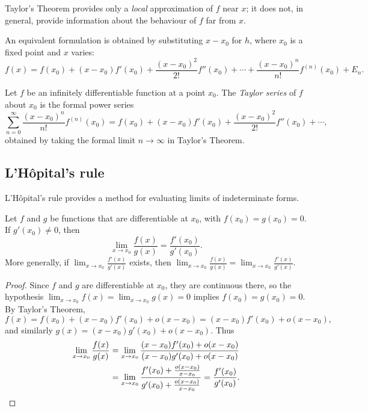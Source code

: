\documentclass[a4paper]{article}
\begin{document}
\begin{remark}
  Taylor's Theorem provides only a \emph{local} approximation of $f$ near $x$; it does not, in general, provide information about the behaviour of $f$ far from $x$.

  An equivalent formulation is obtained by substituting $x - x_0$ for $h$, where $x_0$ is a fixed point and $x$ varies:
  \[
    f(x) = f(x_0) + (x-x_0)f'(x_0) + \frac{(x-x_0)^2}{2!}f''(x_0) + \cdots + \frac{(x-x_0)^n}{n!}f^{(n)}(x_0) + E_n.
  \]
\end{remark}

\begin{defi}
  Let $f$ be an infinitely differentiable function at a point $x_0$. The \emph{Taylor series} of $f$ about $x_0$ is the formal power series
  \[
    \sum_{n=0}^{\infty} \frac{(x-x_0)^n}{n!}f^{(n)}(x_0) = f(x_0) + (x-x_0)f'(x_0) + \frac{(x-x_0)^2}{2!}f''(x_0) + \cdots,
  \]
  obtained by taking the formal limit $n \to \infty$ in Taylor's Theorem.
\end{defi}

\subsection{L'H\^opital's rule}
L'H\^opital's rule provides a method for evaluating limits of indeterminate forms.

\begin{thm}
  Let $f$ and $g$ be functions that are differentiable at $x_0$, with $f(x_0) = g(x_0) = 0$. If $g'(x_0) \neq 0$, then
  \[
    \lim_{x\to x_0} \frac{f(x)}{g(x)} = \frac{f'(x_0)}{g'(x_0)}.
  \]
  More generally, if $\displaystyle\lim_{x\to x_0} \frac{f'(x)}{g'(x)}$ exists, then $\displaystyle\lim_{x\to x_0} \frac{f(x)}{g(x)} = \lim_{x\to x_0} \frac{f'(x)}{g'(x)}$.
\end{thm}

\begin{proof}
  Since $f$ and $g$ are differentiable at $x_0$, they are continuous there, so the hypothesis $\lim_{x\to x_0}f(x) = \lim_{x\to x_0}g(x) = 0$ implies $f(x_0) = g(x_0) = 0$. By Taylor's Theorem,
  \[
    f(x) = f(x_0) + (x - x_0)f'(x_0) + o(x - x_0) = (x - x_0)f'(x_0) + o(x - x_0),
  \]
  and similarly $g(x) = (x - x_0)g'(x_0) + o(x - x_0)$. Thus
  \begin{align*}
    \lim_{x\to x_0} \frac{f(x)}{g(x)} &= \lim_{x\to x_0} \frac{(x - x_0)f'(x_0) + o(x - x_0)}{(x - x_0)g'(x_0) + o(x - x_0)}\\
    &= \lim_{x\to x_0} \frac{f'(x_0) + \frac{o(x-x_0)}{x-x_0}}{g'(x_0) + \frac{o(x-x_0)}{x-x_0}} = \frac{f'(x_0)}{g'(x_0)}.\qedhere
  \end{align*}
\end{proof}
\end{document}
